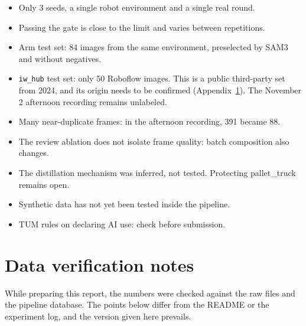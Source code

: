 \documentclass[11pt,a4paper]{article}
\begin{document}
\begin{itemize}
  \item Only 3 seeds, a single robot environment and a single real round.
  \item Passing the gate is close to the limit and varies between repetitions.
  \item Arm test set: 84 images from the same environment, preselected by SAM3 and
    without negatives.
  \item \texttt{iw\_hub} test set: only 50 Roboflow images. This is a public
    third-party set from 2024, and its origin needs to be confirmed
    (Appendix~\ref{ap:notes}). The November 2 afternoon recording remains unlabeled.
  \item Many near-duplicate frames: in the afternoon recording, 391 became 88.
  \item The review ablation does not isolate frame quality: batch composition also
    changes.
  \item The distillation mechanism was inferred, not tested. Protecting pallet\_truck
    remains open.
  \item Synthetic data has not yet been tested inside the pipeline.
  \item TUM rules on declaring AI use: check before submission.
\end{itemize}

\appendix

\section{Data verification notes}
\label{ap:notes}

While preparing this report, the numbers were checked against the raw files and the
pipeline database. The points below differ from the README or the experiment log,
and the version given here prevails.
\end{document}
